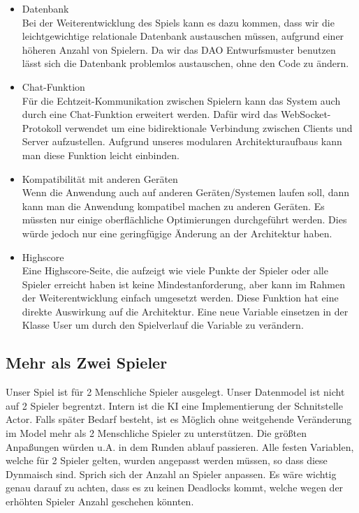 \documentclass[fontsize=12pt,paper=a4,twoside]{scrartcl}
\begin{document}
\begin{itemize}
	\item Datenbank\\ Bei der Weiterentwicklung des Spiels kann es dazu kommen, dass wir die leichtgewichtige relationale Datenbank austauschen müssen, aufgrund einer höheren Anzahl von Spielern. Da wir das DAO Entwurfsmuster benutzen lässt sich die Datenbank problemlos austauschen, ohne den Code zu ändern.
	\item Chat-Funktion\\ Für die Echtzeit-Kommunikation zwischen Spielern kann das System auch durch eine Chat-Funktion erweitert werden. Dafür wird das WebSocket-Protokoll verwendet um eine bidirektionale Verbindung zwischen Clients und Server aufzustellen. Aufgrund unseres modularen Architekturaufbaus kann man diese Funktion leicht einbinden.
	\item Kompatibilität mit anderen Geräten\\ Wenn die Anwendung auch auf anderen Geräten/Systemen laufen soll, dann kann man die Anwendung kompatibel machen zu anderen Geräten. Es müssten nur einige oberflächliche Optimierungen durchgeführt werden. Dies würde jedoch nur eine geringfügige Änderung an der Architektur haben.
	\item Highscore\\ Eine Highscore-Seite, die aufzeigt wie viele Punkte der Spieler oder alle Spieler erreicht haben ist keine Mindestanforderung, aber kann im Rahmen der Weiterentwicklung einfach umgesetzt werden. Diese Funktion hat eine direkte Auswirkung auf die Architektur. Eine neue Variable einsetzen in der Klasse User um durch den Spielverlauf die Variable zu verändern.
\end{itemize}

\subsection{Mehr als Zwei Spieler}
Unser Spiel ist für 2 Menschliche Spieler ausgelegt. Unser Datenmodel ist nicht auf 2 Spieler begrentzt. Intern
ist die KI eine Implementierung der Schnitstelle Actor. Falls später Bedarf besteht, ist es Möglich ohne weitgehende Veränderung im Model
mehr als 2 Menschliche Spieler zu unterstützen. Die größten Anpaßungen würden u.A. in dem Runden ablauf passieren. Alle festen Variablen, welche für 2 Spieler gelten, wurden angepasst werden müssen, so dass diese Dynmaisch sind. Sprich sich der Anzahl an Spieler anpassen.
Es wäre wichtig genau darauf zu achten, dass es zu keinen Deadlocks kommt, welche wegen der erhöhten Spieler Anzahl geschehen könnten.

\end{document}
